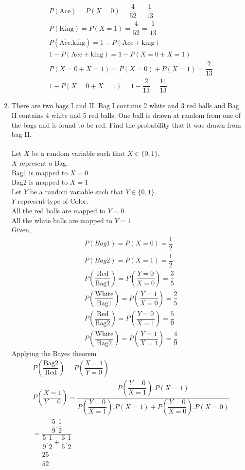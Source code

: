 \documentclass[journal,12pt,twocolumn]{IEEEtran}
\renewcommand\thesection{\arabic{section}}
\begin{document}
\begin{enumerate}[label=\thesection.\arabic*.,ref=\thesection.\theenumi]
\begin{align}
&P(\text{Ace}) =  P(X=0) = \dfrac{4}{52} = \dfrac{1}{13}\\
&P(\text{King}) =  P(X=1) = \dfrac{4}{52} = \dfrac{1}{13} \\
&P(\overline{\text{Ace}}.\overline{ \text{king}}) = 1 - P(\text{Ace}+\text{king}) \\
&1 - P(\text{Ace}+\text{king}) = 1-P(X=0 + X=1)\\
&P(X=0 + X=1) = P(X=0)+ P(X=1) = \dfrac{2}{13} \\
&1-P(X=0 + X=1) = 1-\dfrac{2}{13} = \dfrac{11}{13}
 \end{align}
 \item There are two bags I and II. Bag I contains 2 white and 3 red balls and Bag II contains 4 white and 5 red balls. One ball is drawn at random from one of the bags and is found to be red. Find the probability that it was drawn from bag II.\\
 \solution\\
 Let $X$ be a random variable such that $X \in\{0,1\}$.\\ $X$ represent a Bag.\\
Bag1 is mapped to $X=0$\\
 Bag2 is mapped to $X=1$\\
Let $Y$ be a random variable such that $Y \in\{0,1\}$.\\ $Y$ represent type of Color.\\
All the red balls are mapped to $Y=0$\\
 All the white balls are mapped to $Y=1$\\
Given,
\begin{align}
&P(Bag1) = P(X=0) = \dfrac{1}{2}\\
&P(Bag2) = P(X=1) = \dfrac{1}{2}\\
&P\left(\dfrac{\text{Red}}{\text{Bag1}}\right) = P\left(\dfrac{Y=0}{X=0}\right) = \dfrac{3}{5}\\
&P\left(\dfrac{\text{White}}{\text{Bag1}}\right) = P\left(\dfrac{Y=1}{X=0}\right) = \dfrac{2}{5}\\
&P\left(\dfrac{\text{Red}}{\text{Bag2}}\right) = P\left(\dfrac{Y=0}{X=1}\right) = \dfrac{5}{9}\\
&P\left(\dfrac{\text{White}}{\text{Bag2}}\right) = P\left(\dfrac{Y=1}{X=1}\right) = \dfrac{4}{9}
\end{align}
Applying the Bayes theorem
\begin{align}
&P\left(\dfrac{\text{Bag2}}{\text{Red}}\right) = P\left(\dfrac{X=1}{Y=0}\right)\\
&P\left(\dfrac{X=1}{Y=0}\right) = \dfrac{P\left(\dfrac{Y=0}{X=1}\right).P(X=1)}{P\left(\dfrac{Y=0}{X=1}\right).P(X=1)+P\left(\dfrac{Y=0}{X=0}\right).P(X=0)}\\
& = \dfrac{\dfrac{5}{9}.\dfrac{1}{2}}{\dfrac{5}{9}.\dfrac{1}{2}+\dfrac{3}{5}.\dfrac{1}{2}}\\
& = \dfrac{25}{52}
\end{align}


\end{enumerate}
\end{document}

